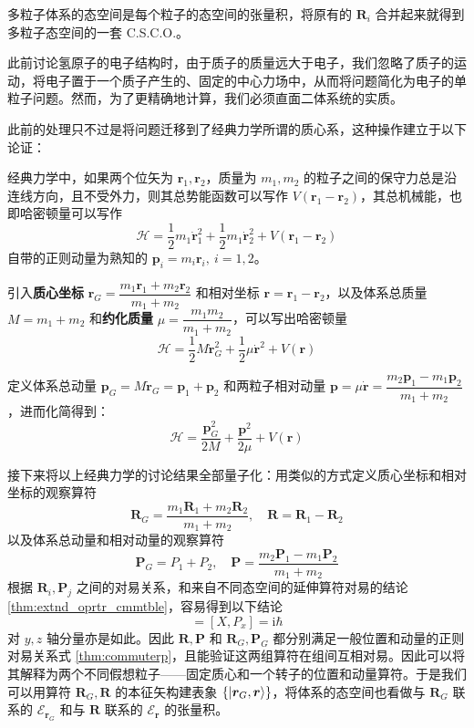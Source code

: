\documentclass[cn,10pt,math=newtx,citestyle=gb7714-2015,bibstyle=gb7714-2015]{elegantbook}
\def\bm{\boldsymbol}
\def\ms{\mathscr}
\def\mc{\mathcal}
\def\i{\mathrm i}
\begin{document}
\begin{postulate}[多粒子体系的态空间]
多粒子体系的态空间是每个粒子的态空间的张量积，将原有的 $\bm R_i$ 合并起来就得到多粒子态空间的一套 C.S.C.O.。
\end{postulate}

此前讨论氢原子的电子结构时，由于质子的质量远大于电子，我们忽略了质子的运动，将电子置于一个质子产生的、固定的中心力场中，从而将问题简化为电子的单粒子问题。然而，为了更精确地计算，我们必须直面二体系统的实质。

此前的处理只不过是将问题迁移到了经典力学所谓的质心系，这种操作建立于以下论证：

经典力学中，如果两个位矢为 $\bm r_1,\bm r_2$，质量为 $m_1,m_2$ 的粒子之间的保守力总是沿连线方向，且不受外力，则其总势能函数可以写作 $V(\bm r_1-\bm r_2)$，其总机械能，也即哈密顿量可以写作
\begin{equation}
    \mc H = \frac 1 2 m_1\dot{\bm r}_1^2+\frac 1 2 m_1\dot{\bm r}_2^2+V(\bm r_1-\bm r_2)
\end{equation}
自带的正则动量为熟知的 $\bm p_i = m_i\bm r_i,\ i=1,2$。

引入\textbf{质心坐标} $\bm r_G = \dfrac{m_1\bm r_1+m_2\bm r_2}{m_1+m_2}$ 和相对坐标 $\bm r=\bm r_1-\bm r_2$，以及体系总质量 $M = m_1+m_2$ 和\textbf{约化质量} $\mu = \dfrac{m_1m_2}{m_1+m_2}$，可以写出哈密顿量
\begin{equation}
    \mc H = \frac 1 2 M\dot{\bm r}_G^2+\frac 1 2\mu\dot{\bm r}^2+V(\bm r)
\end{equation}

定义体系总动量 $\bm p_G = M\dot{\bm r}_G = \bm p_1+\bm p_2$ 和两粒子相对动量 $\bm p = \mu\dot{\bm r} = \dfrac{m_2\bm p_1-m_1\bm p_2}{m_1+m_2}$，进而化简得到：
\begin{equation}
    \mc H = \frac{\bm p_G^2}{2M}+\frac{\bm p^2}{2\mu}+V(\bm r)
\end{equation}

接下来将以上经典力学的讨论结果全部量子化：用类似的方式定义质心坐标和相对坐标的观察算符
\begin{equation}
    \bm R_G = \frac{m_1\bm R_1+m_2\bm R_2}{m_1+m_2},\quad \bm R = \bm R_1-\bm R_2
\end{equation}
以及体系总动量和相对动量的观察算符
\begin{equation}
    \bm P_G = P_1+P_2,\quad \bm P =\frac{m_2\bm P_1-m_1\bm P_2}{m_1+m_2}
\end{equation}
根据 $\bm R_i,\bm P_j$ 之间的对易关系，和来自不同态空间的延伸算符对易的结论 \ref{thm:extnd_oprtr_cmmtble}，容易得到以下结论
\begin{equation}
    [X_G, P_{Gx}] = [X,P_x] = \i\hbar
\end{equation}
对 $y,z$ 轴分量亦是如此。因此 $\bm R,\bm P$ 和 $\bm R_G,\bm P_G$ 都分别满足一般位置和动量的正则对易关系式 \ref{thm:commuterp}，且能验证这两组算符在组间互相对易。因此可以将其解释为两个不同假想粒子——固定质心和一个转子的位置和动量算符。于是我们可以用算符 $\bm R_G,\bm R$ 的本征矢构建表象 $\{\ket{\bm r_G,\bm r}\}$，将体系的态空间也看做与 $\bm R_G$ 联系的 $\ms E_{\bm r_G}$ 和与 $\bm R$ 联系的 $\ms E_{\bm r}$ 的张量积。
\end{document}
